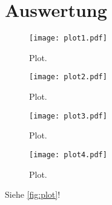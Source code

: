 \section{Auswertung}
\label{sec:Auswertung}

\begin{figure}
  \centering
  \texttt{[image: plot1.pdf]}
  \caption{Plot.}
  \label{fig:plot}
\end{figure}

\begin{figure}
  \centering
  \texttt{[image: plot2.pdf]}
  \caption{Plot.}
  \label{fig:plot2}
\end{figure}

\begin{figure}
  \centering
  \texttt{[image: plot3.pdf]}
  \caption{Plot.}
  \label{fig:plot3}
\end{figure}

\begin{figure}
  \centering
  \texttt{[image: plot4.pdf]}
  \caption{Plot.}
  \label{fig:plot4}
\end{figure}


Siehe \autoref{fig:plot}!
